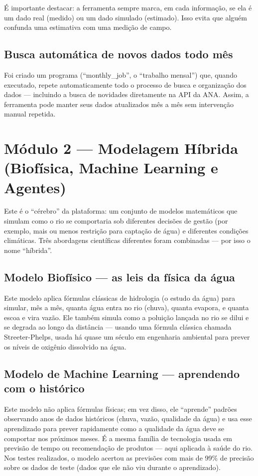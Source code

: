 \documentclass[11pt,a4paper]{article}
\begin{document}
É importante destacar: a ferramenta sempre marca, em cada informação, se ela é um dado real (medido) ou um dado simulado (estimado). Isso evita que alguém confunda uma estimativa com uma medição de campo.

\subsection{Busca automática de novos dados todo mês}

Foi criado um programa (``monthly\_job'', o ``trabalho mensal'') que, quando executado, repete automaticamente todo o processo de busca e organização dos dados — incluindo a busca de novidades diretamente na API da ANA. Assim, a ferramenta pode manter seus dados atualizados mês a mês sem intervenção manual repetida.

\section{Módulo 2 — Modelagem Híbrida (Biofísica, Machine Learning e Agentes)}

Este é o ``cérebro'' da plataforma: um conjunto de modelos matemáticos que simulam como o rio se comportaria sob diferentes decisões de gestão (por exemplo, mais ou menos restrição para captação de água) e diferentes condições climáticas. Três abordagens científicas diferentes foram combinadas — por isso o nome ``híbrida''.

\subsection{Modelo Biofísico — as leis da física da água}

Este modelo aplica fórmulas clássicas de hidrologia (o estudo da água) para simular, mês a mês, quanta água entra no rio (chuva), quanta evapora, e quanta escoa e vira vazão. Ele também simula como a poluição lançada no rio se dilui e se degrada ao longo da distância — usando uma fórmula clássica chamada Streeter-Phelps, usada há quase um século em engenharia ambiental para prever os níveis de oxigênio dissolvido na água.

\subsection{Modelo de Machine Learning — aprendendo com o histórico}

Este modelo não aplica fórmulas físicas; em vez disso, ele ``aprende'' padrões observando anos de dados históricos (chuva, vazão, qualidade da água) e usa esse aprendizado para prever rapidamente como a qualidade da água deve se comportar nos próximos meses. É a mesma família de tecnologia usada em previsão de tempo ou recomendação de produtos — aqui aplicada à saúde do rio. Nos testes realizados, o modelo acertou as previsões com mais de 99\% de precisão sobre os dados de teste (dados que ele não viu durante o aprendizado).
\end{document}
